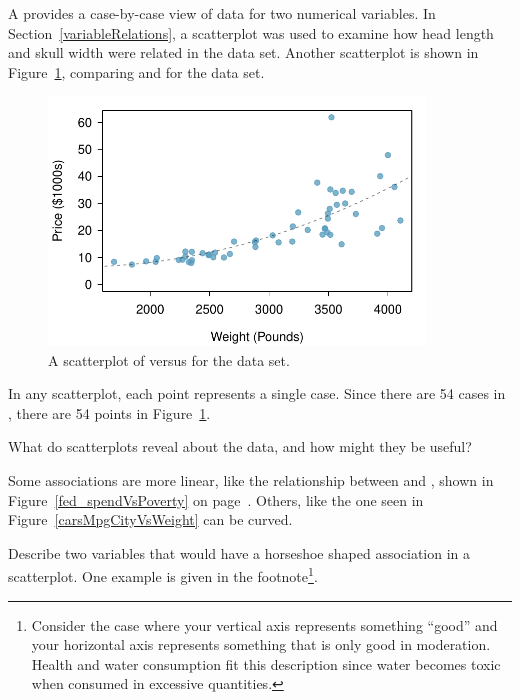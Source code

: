 A  provides a case-by-case view of data for two numerical variables. In Section~\ref{variableRelations}, a scatterplot was used to examine how head length and skull width were related in the  data set. Another scatterplot is shown in Figure~\ref{carsPriceVsWeight}, comparing  and  for the  data set.
\begin{figure}[h]
   \centering
   \includegraphics[height=2.6in]{01/figures/carsPriceVsWeight/carsPriceVsWeight}
   \caption{A scatterplot of  versus  for the  data set.}
   \label{carsPriceVsWeight}
\end{figure}

In any scatterplot, each point represents a single case. Since there are 54 cases in , there are 54 points in Figure~\ref{carsPriceVsWeight}.

\begin{exercise}
What do scatterplots reveal about the data, and how might they be useful?
\end{exercise}

Some associations are more linear, like the relationship between  and , shown in Figure~\ref{fed_spendVsPoverty} on page~\pageref{fed_spendVsPoverty}. Others, like the one seen in Figure~\ref{carsMpgCityVsWeight} can be curved.

\begin{exercise}
Describe two variables that would have a horseshoe shaped association in a scatterplot. One example is given in the footnote\footnote{Consider the case where your vertical axis represents something ``good'' and your horizontal axis represents something that is only good in moderation. Health and water consumption fit this description since water becomes toxic when consumed in excessive quantities.}.
\end{exercise}

